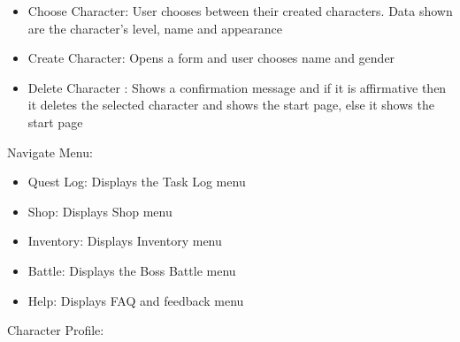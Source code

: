 \documentclass[12pt]{report}
\renewcommand{\_}{\kern-1.5pt\textunderscore\kern-1.5pt}
\begin{document}
\begin{itemize}
	\item Choose Character: User chooses between their created characters. Data shown are the character’s level, name and appearance\par

	\item Create Character: Opens a form and user chooses name and gender\par

	\item Delete Character : Shows a confirmation message and if it is affirmative then it deletes the selected character and shows the start page, else it shows the start page
\end{itemize}\par


\vspace{\baselineskip}
Navigate Menu:\par

\begin{itemize}
	\item Quest Log: Displays the Task Log menu \par

	\item Shop: Displays Shop menu\par

	\item Inventory: Displays Inventory menu\par

	\item Battle: Displays the Boss Battle menu\par

	\item Help: Displays FAQ and feedback menu
\end{itemize}\par


\vspace{\baselineskip}
\vspace{\baselineskip}
Character Profile:\par
\end{document}
